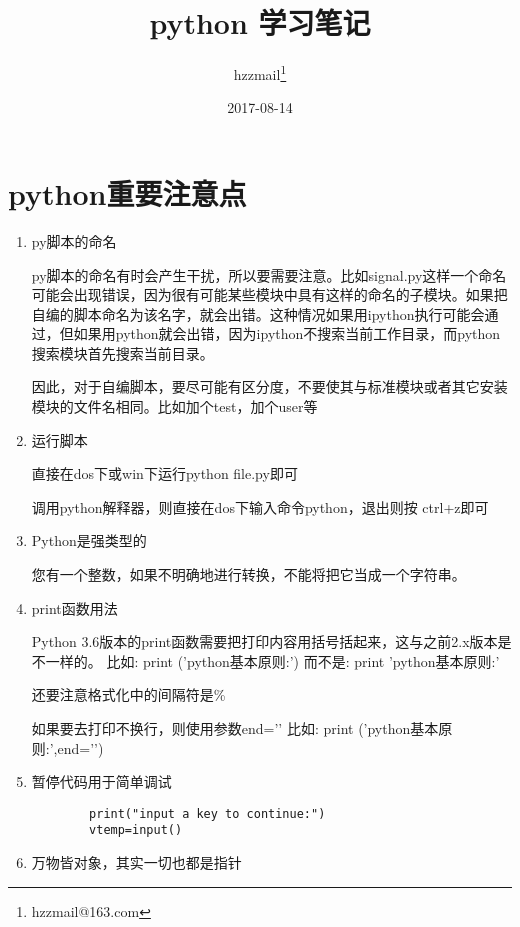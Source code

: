 \documentclass[twoside,11pt]{book}
\begin{document}
\title{python 学习笔记}
\author{hzzmail\thanks{hzzmail@163.com}}
\date{2017-08-14}
\maketitle


\chapter{python重要注意点}

\begin{enumerate}
  \item py脚本的命名

  py脚本的命名有时会产生干扰，所以要需要注意。比如signal.py这样一个命名可能会出现错误，因为很有可能某些模块中具有这样的命名的子模块。如果把自编的脚本命名为该名字，就会出错。这种情况如果用ipython执行可能会通过，但如果用python就会出错，因为ipython不搜索当前工作目录，而python搜索模块首先搜索当前目录。

  因此，对于自编脚本，要尽可能有区分度，不要使其与标准模块或者其它安装模块的文件名相同。比如加个test，加个user等

  \item 运行脚本

    直接在dos下或win下运行python file.py即可

    调用python解释器，则直接在dos下输入命令python，退出则按 ctrl+z即可

  \item Python是强类型的

    您有一个整数，如果不明确地进行转换，不能将把它当成一个字符串。

  \item print函数用法

    Python 3.6版本的print函数需要把打印内容用括号括起来，这与之前2.x版本是不一样的。
    比如:
    print ('python基本原则:')
    而不是:
    print 'python基本原则:'

    还要注意格式化中的间隔符是\%

    如果要去打印不换行，则使用参数end=’’
    比如:
    print ('python基本原则:',end=’’)

  \item 暂停代码用于简单调试
  \begin{lstlisting}
        print("input a key to continue:")
        vtemp=input()
  \end{lstlisting}

  \item 万物皆对象，其实一切也都是指针


\end{enumerate}
\end{document}
